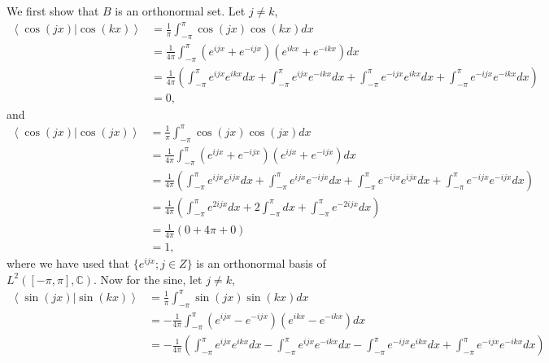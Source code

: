 \begin{questions}

\begin{solution}
We first show that $B$ is an orthonormal set. Let $j\neq k$,
\begin{align*}
\left<\cos(jx)|\cos(kx)\right>&=\frac{1}{\pi}\int_{-\pi}^{\pi}\cos(jx)\cos(kx)dx\\
&=\frac{1}{4\pi}\int_{-\pi}^{\pi}\left(e^{ijx}+e^{-ijx}\right)\left(e^{ikx}+e^{-ikx}\right)dx\\
&=\frac{1}{4\pi}\left(\int_{-\pi}^{\pi}e^{ijx}e^{ikx}dx+\int_{-\pi}^{\pi}e^{ijx}e^{-ikx}dx+\int_{-\pi}^{\pi}e^{-ijx}e^{ikx}dx+\int_{-\pi}^{\pi}e^{-ijx}e^{-ikx}dx\right)\\
&=0,
\end{align*}
and
\begin{align*}
\left<\cos(jx)|\cos(jx)\right>&=\frac{1}{\pi}\int_{-\pi}^{\pi}\cos(jx)\cos(jx)dx\\
&=\frac{1}{4\pi}\int_{-\pi}^{\pi}\left(e^{ijx}+e^{-ijx}\right)\left(e^{ijx}+e^{-ijx}\right)dx\\
&=\frac{1}{4\pi}\left(\int_{-\pi}^{\pi}e^{ijx}e^{ijx}dx+\int_{-\pi}^{\pi}e^{ijx}e^{-ijx}dx+\int_{-\pi}^{\pi}e^{-ijx}e^{ijx}dx+\int_{-\pi}^{\pi}e^{-ijx}e^{-ijx}dx\right)\\
&=\frac{1}{4\pi}\left(\int_{-\pi}^{\pi}e^{2ijx}dx+2\int_{-\pi}^{\pi}dx+\int_{-\pi}^{\pi}e^{-2ijx}dx\right)\\
&=\frac{1}{4\pi}\left(0+4\pi+0\right)\\
&=1,
\end{align*}
where we have used that $\{e^{ijx}; j \in Z\}$ is an orthonormal basis of $L^2([-\pi,\pi],\mathbb{C})$. Now for the sine, let $j\neq k$,
\begin{align*}
\left<\sin(jx)|\sin(kx)\right>&=\frac{1}{\pi}\int_{-\pi}^{\pi}\sin(jx)\sin(kx)dx\\
&=-\frac{1}{4\pi}\int_{-\pi}^{\pi}\left(e^{ijx}-e^{-ijx}\right)\left(e^{ikx}-e^{-ikx}\right)dx\\
&=-\frac{1}{4\pi}\left(\int_{-\pi}^{\pi}e^{ijx}e^{ikx}dx-\int_{-\pi}^{\pi}e^{ijx}e^{-ikx}dx-\int_{-\pi}^{\pi}e^{-ijx}e^{ikx}dx+\int_{-\pi}^{\pi}e^{-ijx}e^{-ikx}dx\right)\\

\end{align*}
\end{solution}
\end{questions}
